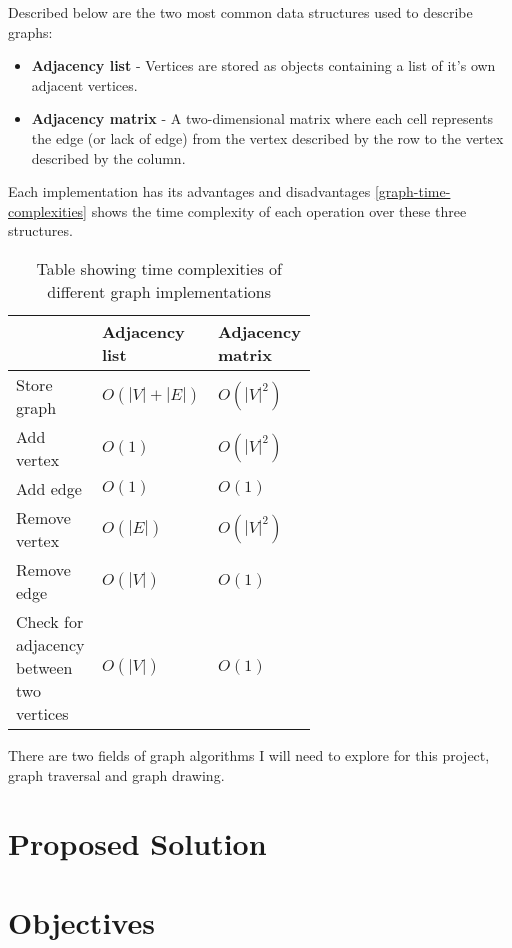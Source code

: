         Described below are the two most common data structures used to describe graphs:

        \begin{itemize}
            \item \textbf{Adjacency list} - Vertices are stored as objects containing a list of it's own adjacent vertices.
            \item \textbf{Adjacency matrix} - A two-dimensional matrix where each cell represents the edge (or lack of edge) from the vertex described by the row to the vertex described by the column.
        \end{itemize}

        Each implementation has its advantages and disadvantages \autoref{graph-time-complexities} shows the time complexity of each operation over these three structures.


        \begin{table}
            \centering
            \begin{tabular}{|p{0.2\linewidth}|p{0.2\linewidth}|p{0.2\linewidth}|} \hline
            & Adjacency list & Adjacency matrix \\ \hline
            Store graph   & $O(|V|+|E|)$ & $O(|V|^2)$ \\ \hline
            Add vertex    & $O(1)$ & $O(|V|^2)$ \\ \hline
            Add edge      & $O(1)$ & $O(1)$ \\ \hline
            Remove vertex & $O(|E|)$ & $O(|V|^2)$ \\ \hline
            Remove edge   & $O(|V|)$ & $O(1)$ \\ \hline
            Check for adjacency between two vertices & $O(|V|)$ & $O(1)$ \\ \hline
            \end{tabular}
            \caption{Table showing time complexities of different graph implementations \cite{graph-time-complexities}}
            \label{graph-time-complexities}
        \end{table}

        There are two fields of graph algorithms I will need to explore for this project, graph traversal and graph drawing.

\section{Proposed Solution}

\section{Objectives}
